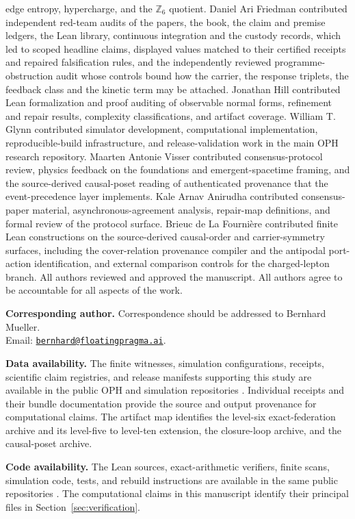 \documentclass[11pt]{article}
\theoremstyle{definition}
\theoremstyle{remark}
\begin{document}
edge entropy, hypercharge, and the $\mathbb Z_6$ quotient. Daniel Ari Friedman contributed independent
red-team audits of the papers, the book, the claim and premise ledgers, the
Lean library, continuous integration and the custody records, which led to
scoped headline claims, displayed values matched to their certified receipts
and repaired falsification rules, and the independently reviewed
programme-obstruction audit whose controls bound how the carrier, the
response triplets, the feedback class and the kinetic term may be attached. Jonathan Hill
contributed Lean formalization and proof auditing of observable normal forms,
refinement and repair results, complexity classifications, and artifact
coverage. William T. Glynn contributed simulator development, computational
implementation, reproducible-build infrastructure, and release-validation
work in the main OPH research repository. Maarten Antonie Visser contributed
consensus-protocol review, physics feedback on the foundations and
emergent-spacetime framing, and the source-derived causal-poset reading of
authenticated provenance that the event-precedence layer implements. Kale Arnav Anirudha contributed consensus-paper
material, asynchronous-agreement analysis, repair-map definitions, and formal
review of the protocol surface. Brieuc de La Fourni\`ere contributed finite
Lean constructions on the source-derived causal-order and carrier-symmetry
surfaces, including the cover-relation provenance compiler and the antipodal
port-action identification, and external comparison controls for the
charged-lepton branch.
All authors reviewed and approved
the manuscript. All authors agree to be accountable for all aspects of the
work.

\noindent\textbf{Corresponding author.}
Correspondence should be addressed to Bernhard Mueller.\\
Email:
\href{mailto:bernhard@floatingpragma.ai}{\nolinkurl{bernhard@floatingpragma.ai}}.

\noindent\textbf{Data availability.}
The finite witnesses, simulation configurations, receipts, scientific claim registries, and
release manifests supporting this study are available in the public OPH and
simulation repositories \cite{ophrepo,ophsim}. Individual receipts and their
bundle documentation provide the source and output provenance for
computational claims. The artifact map identifies the level-six
exact-federation archive and its level-five to level-ten extension, the
closure-loop archive, and the causal-poset archive. 

\noindent\textbf{Code availability.}
The Lean sources, exact-arithmetic verifiers, finite scans, simulation code,
tests, and rebuild instructions are available in the same public repositories
\cite{ophrepo,ophsim}. The computational claims in this manuscript identify
their principal files in Section~\ref{sec:verification}. 
\end{document}
